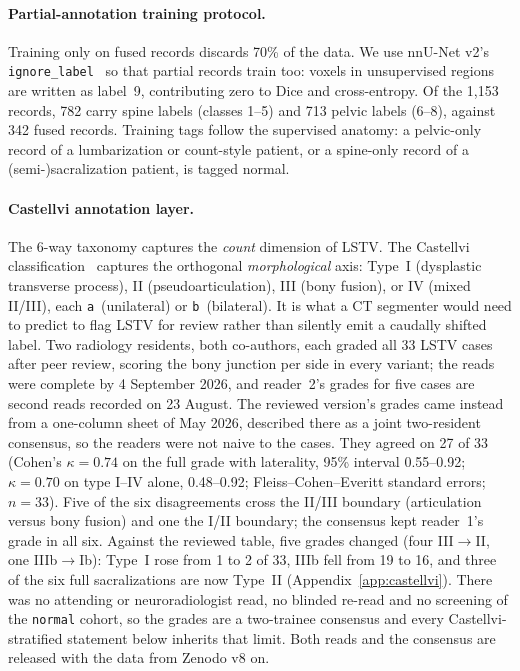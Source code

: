 \documentclass{article}
\begin{document}
\paragraph{Partial-annotation training protocol.}
\label{sec:partial}
Training only on fused records discards 70\% of the data.
We use nnU-Net v2's
\texttt{ignore\_label}~\citep{Isensee2024Nnu-netSegmentation}
so that partial records train too: voxels in unsupervised
regions are written as label~9, contributing zero to Dice
and cross-entropy. Of the 1{,}153 records, 782 carry spine
labels (classes 1--5) and 713 pelvic labels (6--8),
against 342 fused records. Training tags follow the
supervised anatomy: a pelvic-only record of a lumbarization or count-style
patient, or a spine-only record of a (semi-)sacralization
patient, is tagged normal.

\paragraph{Castellvi annotation layer.}
\label{sec:castellvi}
The 6-way taxonomy captures the \emph{count} dimension of
LSTV. The Castellvi
classification~\citep{Castellvi1984LumbosacralDefects}
captures the orthogonal \emph{morphological} axis:
Type~I (dysplastic transverse process), II
(pseudoarticulation), III (bony fusion), or IV (mixed
II/III), each \texttt{a}~(unilateral) or
\texttt{b}~(bilateral). It is what a CT segmenter would
need to predict to flag LSTV for review rather than
silently emit a caudally shifted label. Two radiology
residents, both co-authors, each graded all 33 LSTV cases
after peer review, scoring the bony junction per side in
every variant; the reads were complete by 4 September
2026, and reader~2's grades for five cases are second
reads recorded on 23 August. The reviewed version's
grades came instead from a one-column sheet of May 2026,
described there as a joint two-resident consensus, so the
readers were not naive to the cases. They agreed on 27 of 33
(Cohen's $\kappa{=}0.74$ on the full grade with
laterality, 95\% interval 0.55--0.92; $\kappa{=}0.70$ on
type I--IV alone, 0.48--0.92; Fleiss--Cohen--Everitt
standard errors; $n{=}33$). Five of the six disagreements
cross the II/III boundary (articulation versus bony
fusion) and one the I/II boundary; the consensus kept
reader~1's grade in all six. Against the reviewed table,
five grades changed (four III$\to$II, one IIIb$\to$Ib):
Type~I rose from 1 to 2 of 33, IIIb fell from 19 to 16,
and three of the six full sacralizations are now Type~II
(Appendix~\ref{app:castellvi}). There was no attending or
neuroradiologist read, no blinded re-read and no screening
of the \texttt{normal} cohort, so the grades are a
two-trainee consensus and every Castellvi-stratified
statement below inherits that limit. Both reads and the
consensus are released with the data from Zenodo v8 on.
\end{document}
